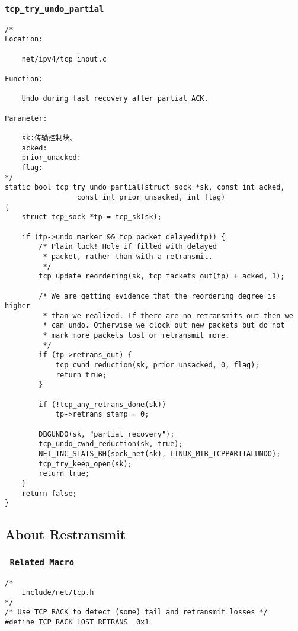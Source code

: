         \subsubsection{\texttt{tcp_try_undo_partial}}
\begin{verbatim}
/*
Location:

    net/ipv4/tcp_input.c

Function:

    Undo during fast recovery after partial ACK. 

Parameter:

    sk:传输控制块。
    acked:
    prior_unacked:
    flag:
*/
static bool tcp_try_undo_partial(struct sock *sk, const int acked,
                 const int prior_unsacked, int flag)
{
    struct tcp_sock *tp = tcp_sk(sk);

    if (tp->undo_marker && tcp_packet_delayed(tp)) {
        /* Plain luck! Hole if filled with delayed
         * packet, rather than with a retransmit.
         */
        tcp_update_reordering(sk, tcp_fackets_out(tp) + acked, 1);

        /* We are getting evidence that the reordering degree is higher
         * than we realized. If there are no retransmits out then we
         * can undo. Otherwise we clock out new packets but do not
         * mark more packets lost or retransmit more.
         */
        if (tp->retrans_out) {
            tcp_cwnd_reduction(sk, prior_unsacked, 0, flag);
            return true;
        }

        if (!tcp_any_retrans_done(sk))
            tp->retrans_stamp = 0;

        DBGUNDO(sk, "partial recovery");
        tcp_undo_cwnd_reduction(sk, true);
        NET_INC_STATS_BH(sock_net(sk), LINUX_MIB_TCPPARTIALUNDO);
        tcp_try_keep_open(sk);
        return true;
    }
    return false;
}
\end{verbatim}
    \subsection{About Restransmit}
        \subsubsection{\texttt{ Related Macro}}
\begin{verbatim}
/*
    include/net/tcp.h
*/
/* Use TCP RACK to detect (some) tail and retransmit losses */
#define TCP_RACK_LOST_RETRANS  0x1
\end{verbatim}

